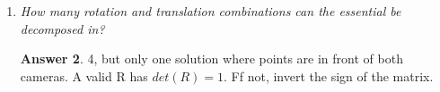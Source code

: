 \documentclass[a4paper,12 pt]{article}
\theoremstyle{definition}
\theoremstyle{remark}
\theoremstyle{definition}
\theoremstyle{definition}
\theoremstyle{definition}
\theoremstyle{definition}
\theoremstyle{remark}
\theoremstyle{remark}
\theoremstyle{definition}
\theoremstyle{definition}
\newtheorem*{answer}{Answer}
\begin{document}
\begin{enumerate}
\begin{answer}
\begin{itemize}
\begin{itemize}
\item This can be solved with Singular Value Decomposition = $[U,E,V]$. Last column of the  V $\rightarrow$ E $\rightarrow$ reshape(E)
\end{itemize}
\item \textbf{Degenerate Solution} if 3D points are coplanar. There is the 5 point algorithm which holds also for coplanar points.
\end{itemize}
\end{answer}
\item \textit{How many rotation and translation combinations can the essential be decomposed in?}
\begin{answer}
4, but only one solution where points are in front of both cameras. A valid R has $det(R) = 1$. Ff not, invert the sign of the matrix.
\end{answer}


\end{enumerate}
\end{document}
